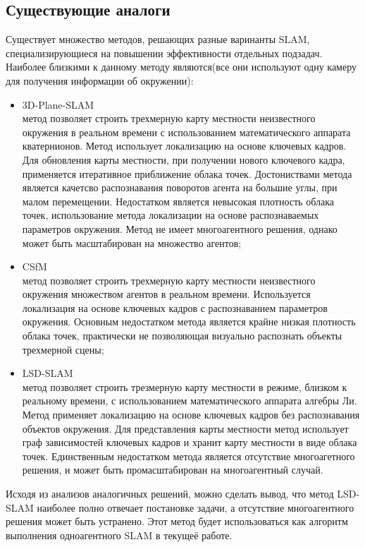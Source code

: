 \subsection{Существующие аналоги}
Существует множество методов, решающих разные варинанты SLAM, специализирующиеся на повышении эффективности отдельных подзадач. Наиболее близкими к данному методу являются(все они используют одну камеру для получения информации об окружении):
\begin{itemize}
    \item 3D-Plane-SLAM~\cite{3DPlaneSLAM}\\
    метод позволяет строить трехмерную карту местности неизвестного окружения в реальном времени с использованием математического аппарата кватернионов. Метод использует локализацию на основе ключевых кадров. Для обновления карты местности, при получении нового ключевого кадра, применяется итеративное приближение облака точек. Достониствами метода является качетсво распознавания поворотов агента на большие углы, при малом перемещении. Недостатком является невысокая плотность облака точек, использование метода локализации на основе распознаваемых параметров окружения. Метод не имеет многоагентного решения, однако может быть масштабирован на множество агентов;
    \item CSfM~\cite{CSFMSLAM}\\
    метод позволяет строить трехмерную карту местности неизвестного окружения множеством агентов в реальном времени. Используется локализация на основе ключевых кадров с распознаванием параметров окружения. Основным недостатком метода является крайне низкая плотность облака точек, практически не позволяющая визуально распознать объекты трехмерной сцены;
    \item LSD-SLAM~\cite{tum3DMonoSLAM}\\
    метод позволяет строить трезмерную карту местности в режиме, близком к реальному времени, с использованием математического аппарата алгебры Ли. Метод применяет локализацию на основе ключевых кадров без распознавания объектов окружения. Для представления карты местности метод использует граф зависимостей ключевых кадров и хранит карту местности в виде облака точек. Единственным недостатком метода является отсутствие многоагетного решения, и может быть промасштабирован на многоагентный случай.
\end{itemize}
Исходя из анализов аналогичных решений, можно сделать вывод, что метод LSD-SLAM наиболее полно отвечает постановке задачи, а отсутствие многоагентного решения может быть устранено. Этот метод будет использоваться как алгоритм выполнения одноагентного SLAM в текущеё работе.


